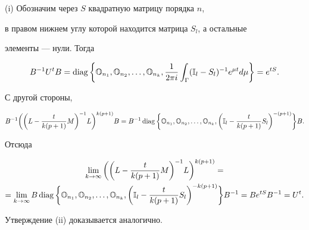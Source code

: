 \begin{pf}


(i) Обозначим через $S$ квадратную матрицу порядка $n$,


в правом нижнем углу которой находится матрица $S_l$, а остальные


элементы --- нули. Тогда


$$


B^{-1} U^t B =


\diag \bigg\{{\Bbb O}_{n_1}, {\Bbb O}_{n_2},\dotsc, {\Bbb


O}_{n_k}, \frac{1}{2\pi i}\int_{\Gamma} ({\Bbb I}_l -


S_l)^{-1} e^{\mu t} d\mu\bigg\} = e^{t S}.


$$





С другой стороны,


$$


B^{-1} \bigg(\bigg(L - \frac{t}{k(p + 1)} M\bigg)^{-1}


L\bigg)^{k(p + 1)} B = B^{-1}


\diag\bigg \{{\Bbb O}_{n_1}, {\Bbb O}_{n_2},\dotsc, {\Bbb


O}_{n_k}, \bigg({\Bbb I}_l - \frac{t}{k(p + 1)} S_l


\bigg)^{-(p+1)}\bigg\} B.


$$





Отсюда


\begin{multline*}


\lim_{k\to\infty}\bigg(\bigg(L - \frac{t}{k(p+1)} M\bigg)^{-1}


L\bigg)^{k(p+1)} = \\


= \lim_{k\to\infty} B


\diag \bigg\{{\Bbb O}_{n_1}, {\Bbb O}_{n_2},\dotsc, {\Bbb


O}_{n_k},


\bigg ({\Bbb I}_l - \frac{t}{k(p+1)} S_l\bigg)^{-k(p+1)}\bigg\} B^{-1} =


B e^{tS} B^{-1} = U^t.


\end{multline*}





Утверждение (ii) доказывается аналогично.


\end{pf}





